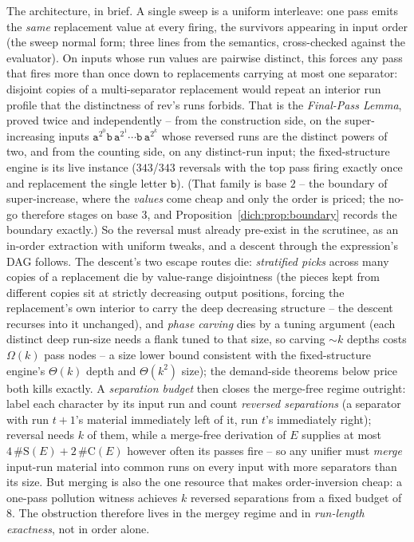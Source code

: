 \documentclass[runningheads,envcountsect]{llncs}
\begin{document}
The architecture, in brief. A single sweep is a uniform interleave: one pass emits the \emph{same} replacement value at every firing, the survivors appearing in input order (the sweep normal form; three lines from the semantics, cross-checked against the evaluator). On inputs whose run values are pairwise distinct, this forces any pass that fires more than once down to replacements carrying at most one separator: disjoint copies of a multi-separator replacement would repeat an interior run profile that the distinctness of $\mathrm{rev}$'s runs forbids. That is the \emph{Final-Pass Lemma}, proved twice and independently -- from the construction side, on the super-increasing inputs $\mathtt a^{2^0}\mathtt b\,\mathtt a^{2^1}\cdots\mathtt b\,\mathtt a^{2^k}$ whose reversed runs are the distinct powers of two, and from the counting side, on any distinct-run input; the fixed-structure engine is its live instance ($343$/$343$ reversals with the top pass firing exactly once and replacement the single letter $\mathtt b$). (That family is base $2$ -- the boundary of super-increase, where the \emph{values} come cheap and only the order is priced; the no-go therefore stages on base $3$, and Proposition~\ref{dich:prop:boundary} records the boundary exactly.) So the reversal must already pre-exist in the scrutinee, as an in-order extraction with uniform tweaks, and a descent through the expression's DAG follows. The descent's two escape routes die: \emph{stratified picks} across many copies of a replacement die by value-range disjointness (the pieces kept from different copies sit at strictly decreasing output positions, forcing the replacement's own interior to carry the deep decreasing structure -- the descent recurses into it unchanged), and \emph{phase carving} dies by a tuning argument (each distinct deep run-size needs a flank tuned to that size, so carving $\sim k$ depths costs $\Omega(k)$ pass nodes -- a size lower bound consistent with the fixed-structure engine's $\Theta(k)$ depth and $\Theta(k^2)$ size); the demand-side theorems below price both kills exactly. A \emph{separation budget} then closes the merge-free regime outright: label each character by its input run and count \emph{reversed separations} (a separator with run $t{+}1$'s material immediately left of it, run $t$'s immediately right); reversal needs $k$ of them, while a merge-free derivation of $E$ supplies at most $4\,\#\mathrm{S}(E) + 2\,\#\mathrm{C}(E)$ however often its passes fire -- so any unifier must \emph{merge} input-run material into common runs on every input with more separators than its size. But merging is also the one resource that makes order-inversion cheap: a one-pass pollution witness achieves $k$ reversed separations from a fixed budget of $8$. The obstruction therefore lives in the mergey regime and in \emph{run-length exactness}, not in order alone.
\end{document}
